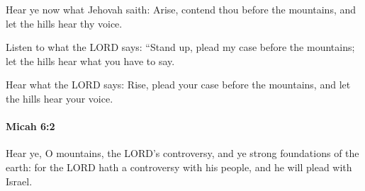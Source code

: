 			\begin{versebox}
					\item[BHS] 
					\item[LXX] 
					\item[ASV] Hear ye now what Jehovah saith: Arise, contend thou before the mountains, and let the hills hear thy voice.
					\item[NIV] Listen to what the LORD says: “Stand up, plead my case before the mountains; let the hills hear what you have to say.
					\item[NRSV] Hear what the LORD says: Rise, plead your case before the mountains, and let the hills hear your voice.
			\end{versebox}

		\paragraph{Micah 6:2} %
			\label{MICAH-6-2}

			Hear ye, O mountains, the LORD's controversy, and ye strong foundations of the earth: for the LORD hath a controversy with his people, and he will plead with Israel.

